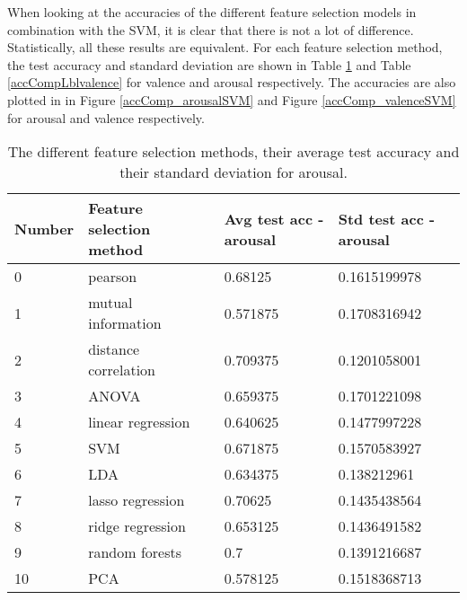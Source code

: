When looking at the accuracies of the different feature selection models in combination with the SVM, it is clear that there is not a lot of difference. Statistically, all these results are equivalent.
For each feature selection method, the test accuracy and standard deviation are shown in Table \ref{accCompLblarousal} and Table \ref{accCompLblvalence} for valence and arousal respectively. The accuracies are also plotted in in Figure \ref{accComp_arousalSVM} and Figure \ref{accComp_valenceSVM} for arousal and valence respectively.


\begin{table}[H]
\centering
\begin{tabular}{llll}
\textbf{Number} & \textbf{Feature selection method} & \textbf{Avg test acc - arousal} & \textbf{Std test acc - arousal} \\ \hline
0               & pearson                           & 0.68125                             & 0.1615199978                    \\
1               & mutual information                & 0.571875                            & 0.1708316942                    \\
2               & distance correlation              & 0.709375                            & 0.1201058001                    \\
3               & ANOVA                             & 0.659375                            & 0.1701221098                    \\
4               & linear regression                 & 0.640625                            & 0.1477997228                    \\
5               & SVM                               & 0.671875                            & 0.1570583927                    \\
6               & LDA                               & 0.634375                            & 0.138212961                     \\
7               & lasso regression                  & 0.70625                             & 0.1435438564                    \\
8               & ridge regression                  & 0.653125                            & 0.1436491582                    \\
9               & random forests                    & 0.7                                 & 0.1391216687                    \\
10              & PCA                               & 0.578125                            & 0.1518368713                   
\end{tabular}
\caption{The different feature selection methods, their average test accuracy and their standard deviation for arousal\label{accCompLblarousal}.}
\end{table}

